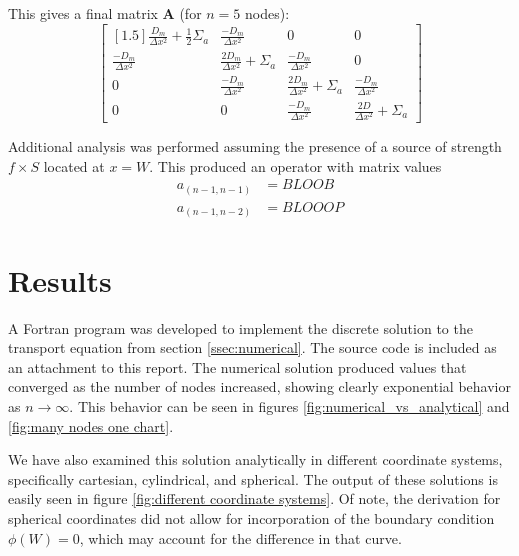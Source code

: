\documentclass[10pt,peerreviewca]{IEEEtran} %
\newcommand{\opmat}[1]{\mathbf{#1}}
\begin{document}
	This gives a final matrix $\opmat{A}$ (for $n=5$ nodes):
	\[
	\begin{bmatrix}[1.5]
		\frac{D_m}{\Delta x^2} + \frac{1}{2}\Sigma_a & \frac{-D_m}{\Delta x^2} & 0 & 0 \\
		\frac{-D_m}{\Delta x^2} & \frac{2D_m}{\Delta x^2} + \Sigma_a & \frac{-D_m}{\Delta x^2} & 0 \\
		0 & \frac{-D_m}{\Delta x^2} & \frac{2D_m}{\Delta x^2} + \Sigma_a & \frac{-D_m}{\Delta x^2} \\
		0 & 0 & \frac{-D_m}{\Delta x^2} & \frac{2D}{\Delta x^2} + \Sigma_a
	\end{bmatrix}
	\]

	Additional analysis was performed assuming the presence of a source of strength $f \times S$ located at $x=W$. This produced an operator with matrix values
	\begin{align*}
		a_{\left( n-1, n-1 \right)} &= BLOOB \\
		a_{\left( n-1, n-2 \right)} &= BLOOOP
	\end{align*}

	\section{Results}
	A Fortran program was developed to implement the discrete solution to the transport equation from section \ref{ssec:numerical}. The source code is included as an attachment to this report. The numerical solution produced values that converged as the number of nodes increased, showing clearly exponential behavior as $n\rightarrow\infty$. This behavior can be seen in figures \ref{fig:numerical_vs_analytical} and \ref{fig:many nodes one chart}. 

	We have also examined this solution analytically in different coordinate systems, specifically cartesian, cylindrical, and spherical. The output of these solutions is easily seen in figure \ref{fig:different coordinate systems}. Of note, the derivation for spherical coordinates did not allow for incorporation of the boundary condition $\phi(W)=0$, which may account for the difference in that curve. 
\end{document}
